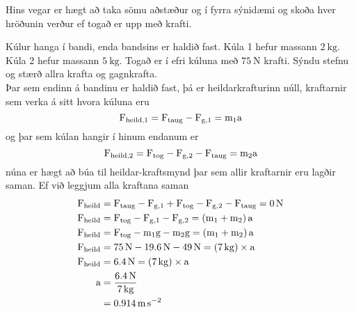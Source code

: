 Hins vegar er hægt að taka sömu aðstæður og í fyrra sýnidæmi og skoða hver
hröðunin verður ef togað er upp með krafti.
\begin{formalexample}
\begin{wrapfigure}{r}{0.25\textwidth}
	\vspace{-20pt}
	\begin{center}
	\end{center}
	\vspace{-10pt}
\end{wrapfigure}
Kúlur hanga í bandi, enda bandsins er haldið fast. Kúla 1 hefur massann $\SI{2}{\kg}$.
Kúla 2 hefur massann $\SI{5}{\kg}$. Togað er í efri kúluna með 
$\SI{75}{\newton}$ krafti.
Sýndu stefnu og stærð allra krafta og gagnkrafta.
\\[4 ex]
Þar sem endinn á bandinu er haldið fast, þá er heildarkrafturinn núll, kraftarnir
sem verka á sitt hvora kúluna eru
\[
	\textrm{F}_\text{heild,1} = \textrm{F}_\text{taug} - \textrm{F}_{\textrm{g},1} = \textrm{m}_\text{1} \textrm{a}
\]
og þar sem kúlan hangir í hinum endanum er
\[
	\textrm{F}_\text{heild,2} = \textrm{F}_\text{tog} 
		- \textrm{F}_{\textrm{g},2} - \textrm{F}_\text{taug} = \textrm{m}_\text{2} \textrm{a}
\]
núna er hægt að búa til heildar-kraftsmynd þar sem allir kraftarnir eru lagðir saman.
Ef við leggjum alla kraftana saman 
\begin{align*}
	\uforce_\text{heild} &= \uforce_\text{taug} - \uforce_{\uacceleg,1}
		+ \uforce_\text{tog} - \uforce_{\uacceleg,2} - \uforce_\text{taug}
		= \SI{0}{\newton} \\
	\uforce_\text{heild} &= \uforce_\text{tog} - \uforce_{\uacceleg,1}
		- \uforce_{\uacceleg,2} 
		= \left( \umass_\text{1} + \umass_\text{2}\right)  \uaccelea \\
	\uforce_\text{heild} &= \uforce_\text{tog} - \umass_1 \uacceleg
		- \umass_2 \uacceleg
		= \left( \umass_\text{1} + \umass_\text{2}\right)  \uaccelea \\
	\uforce_\text{heild} &= \SI{75}{\newton} - \SI{19.6}{\newton}
		- \SI{49}{\newton}
		= \left( \SI{7}{\kg} \right) \times \uaccelea \\
	\uforce_\text{heild} &= \SI{6.4}{\newton} 
		= \left( \SI{7}{\kg} \right) \times \uaccelea \\
	\uaccelea &= \frac{ \SI{6.4}{\newton} }{ \SI{7}{\kg} }
		\\
		&= \SI{0.914}{\meter\per\second\squared}
\end{align*}
\end{formalexample}
